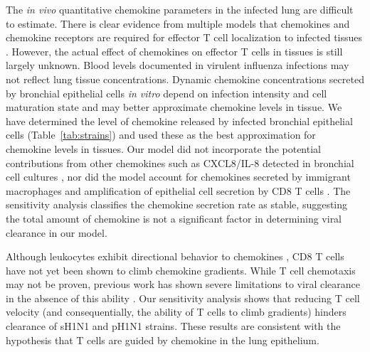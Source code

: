 \documentclass[10pt]{article}
\begin{document}
The \textit{in vivo} quantitative chemokine parameters in the infected lung are difficult to estimate.  There is clear evidence from multiple models that chemokines and chemokine receptors are required for effector T cell localization to infected tissues \cite{Christensen2004, Christensen2006, Dawson2000, DeLemos2005, Fadel2008, Gadhamsetty2014, Groom2011a, Groom2011, Hsieh2006, Klein2005, Kohlmeier2009, Kohlmeier2011, Thapa2008, Wareing2004, Wuest2008, Pawelek2012}. However, the actual effect of chemokines on effector T cells in tissues is still largely unknown.  Blood levels documented in virulent influenza infections \cite{DeJong2006} may not reflect lung tissue concentrations.  Dynamic chemokine concentrations secreted by bronchial epithelial cells \textit{in vitro} depend on infection intensity and cell maturation state \cite{Mitchell2011, Chan2010, Chan2005, Zeng2011} and may better approximate chemokine levels in tissue.  We have determined the level of chemokine released by infected bronchial epithelial cells (Table~\ref{tab:strains}) and used these as the best approximation for chemokine levels in tissues.  Our model did not incorporate the potential contributions from other chemokines such as CXCL8/IL-8 detected in bronchial cell cultures \cite{Matsukura1996, Arndt2002}, nor did the model account for chemokines secreted by immigrant macrophages \cite{Julkunen2000} and amplification of epithelial cell secretion by CD8 T cells \cite{Zhao2000}.  The sensitivity analysis classifies the chemokine secretion rate as stable, suggesting the total amount of chemokine is not a significant factor in determining viral clearance in our model.  

Although leukocytes exhibit directional behavior to chemokines \cite{LiJeon2002, McDonald2010}, CD8 T cells have not yet been shown to climb chemokine gradients.   While T cell chemotaxis may not be proven, previous work has shown severe limitations to viral clearance in the absence of this ability \cite{Banerjee2011}.  Our sensitivity analysis shows that reducing T cell velocity (and consequentially, the ability of T cells to climb gradients) hinders clearance of sH1N1 and pH1N1 strains.   These results are consistent with the hypothesis that T cells are guided by chemokine in the lung epithelium.

\end{document}
